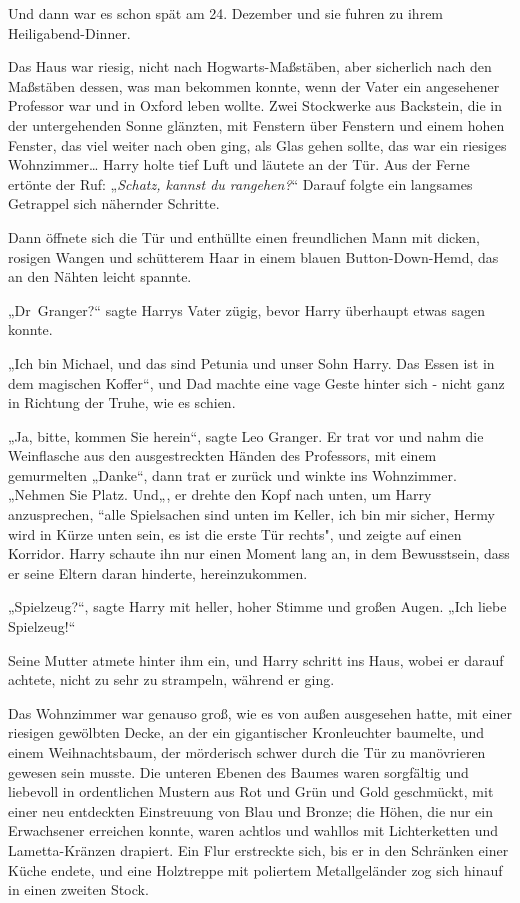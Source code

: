 {Und dann war es schon spät am 24. Dezember und sie fuhren zu ihrem Heiligabend-Dinner.

Das Haus war riesig, nicht nach Hogwarts-Maßstäben, aber sicherlich nach den Maßstäben dessen, was man bekommen konnte, wenn der Vater ein angesehener Professor war und in Oxford leben wollte. Zwei Stockwerke aus Backstein, die in der untergehenden Sonne glänzten, mit Fenstern über Fenstern und einem hohen Fenster, das viel weiter nach oben ging, als Glas gehen sollte, das war ein riesiges Wohnzimmer… Harry holte tief Luft und läutete an der Tür. Aus der Ferne ertönte der Ruf: „\emph{Schatz, kannst du rangehen?}“ Darauf folgte ein langsames Getrappel sich nähernder Schritte.

Dann öffnete sich die Tür und enthüllte einen freundlichen Mann mit dicken, rosigen Wangen und schütterem Haar in einem blauen Button-Down-Hemd, das an den Nähten leicht spannte.

„Dr~Granger?“ sagte Harrys Vater zügig, bevor Harry überhaupt etwas sagen konnte.

„Ich bin Michael, und das sind Petunia und unser Sohn Harry. Das Essen ist in dem magischen Koffer“, und Dad machte eine vage Geste hinter sich - nicht ganz in Richtung der Truhe, wie es schien.

„Ja, bitte, kommen Sie herein“, sagte Leo Granger. Er trat vor und nahm die Weinflasche aus den ausgestreckten Händen des Professors, mit einem gemurmelten „Danke“, dann trat er zurück und winkte ins Wohnzimmer. „Nehmen Sie Platz. Und„, er drehte den Kopf nach unten, um Harry anzusprechen, “alle Spielsachen sind unten im Keller, ich bin mir sicher, Hermy wird in Kürze unten sein, es ist die erste Tür rechts", und zeigte auf einen Korridor. Harry schaute ihn nur einen Moment lang an, in dem Bewusstsein, dass er seine Eltern daran hinderte, hereinzukommen.

„Spielzeug?“, sagte Harry mit heller, hoher Stimme und großen Augen. „Ich liebe Spielzeug!“

Seine Mutter atmete hinter ihm ein, und Harry schritt ins Haus, wobei er darauf achtete, nicht zu sehr zu strampeln, während er ging.

Das Wohnzimmer war genauso groß, wie es von außen ausgesehen hatte, mit einer riesigen gewölbten Decke, an der ein gigantischer Kronleuchter baumelte, und einem Weihnachtsbaum, der mörderisch schwer durch die Tür zu manövrieren gewesen sein musste. Die unteren Ebenen des Baumes waren sorgfältig und liebevoll in ordentlichen Mustern aus Rot und Grün und Gold geschmückt, mit einer neu entdeckten Einstreuung von Blau und Bronze; die Höhen, die nur ein Erwachsener erreichen konnte, waren achtlos und wahllos mit Lichterketten und Lametta-Kränzen drapiert. Ein Flur erstreckte sich, bis er in den Schränken einer Küche endete, und eine Holztreppe mit poliertem Metallgeländer zog sich hinauf in einen zweiten Stock.

}
